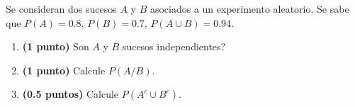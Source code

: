 
Se consideran dos sucesos $A$ y $B$ asociados a un experimento aleatorio. Se sabe que $P(A)=0.8$, $P(B)=0.7$, $P(A\cup B)=0.94$.
\begin{enumerate}[label=\alph*)]
\item \textbf{(1 punto)} \textquestiondown{}Son $A$ y $B$ sucesos independientes?
\item \textbf{(1 punto)} Calcule $P(A/B)$.
\item \textbf{(0.5 puntos)} Calcule $P(A^c\cup B^c)$.
\end{enumerate}

